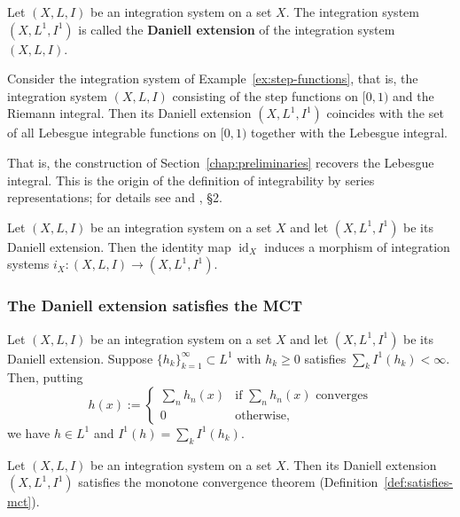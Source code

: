 \begin{definition}
  Let $(X,L,I)$ be an integration system on a set $X$.
  The integration system $(X,L^1,I^1)$ is called the \textbf{Daniell extension}
  of the integration system $(X,L,I)$.
\end{definition}

\begin{example}\label{ex:lebesgue}
  Consider the integration system of Example~\ref{ex:step-functions}, that is,
  the integration system $(X,L,I)$ consisting of the step functions on $[0,1)$
  and the Riemann integral.
  Then its Daniell extension $(X,L^1,I^1)$ coincides with the set of all
  Lebesgue integrable functions on $[0,1)$ together with the Lebesgue integral.

  That is, the construction of Section~\ref{chap:preliminaries} recovers the
  Lebesgue integral.
  This is the origin of the definition of integrability by series
  representations; for details see \cite{Mikusinski} and \cite{BM}, \S2.
\end{example}

\begin{corollary}
  Let $(X,L,I)$ be an integration system on a set $X$ and let
  $(X,L^1,I^1)$ be its Daniell extension.
  Then the identity map $\operatorname{id}_X$ induces a morphism of integration
  systems $i_X:(X,L,I)\to(X,L^1,I^1)$.
\end{corollary}

\subsubsection{The Daniell extension satisfies the MCT}

\begin{lemma}\label{lem:positive-series-flattening}
  Let $(X,L,I)$ be an integration system on a set $X$ and let
  $(X,L^1,I^1)$ be its Daniell extension.
  Suppose $\{h_k\}_{k=1}^{\infty}\subset L^1$ with $h_k\ge0$ satisfies
  $\sum_k I^1(h_k)<\infty$.
  Then, putting
  \[
    h(x):=\begin{cases}
      \sum_n h_n(x) & \text{if $\sum_n h_n(x)$ converges} \\
      0 & \text{otherwise,}
    \end{cases}
  \]
  we have $h\in L^1$ and $I^1(h)=\sum_k I^1(h_k)$.
\end{lemma}

\begin{lemma}\label{lem:daniell-ext-satisfies-mct}
  Let $(X,L,I)$ be an integration system on a set $X$.
  Then its Daniell extension $(X,L^1,I^1)$ satisfies the monotone convergence
  theorem (Definition~\ref{def:satisfies-mct}).
\end{lemma}

